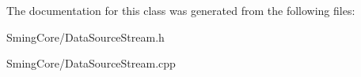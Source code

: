 The documentation for this class was generated from the following files\+:\begin{DoxyCompactItemize}
\item 
Sming\+Core/Data\+Source\+Stream.\+h\item 
Sming\+Core/Data\+Source\+Stream.\+cpp\end{DoxyCompactItemize}
